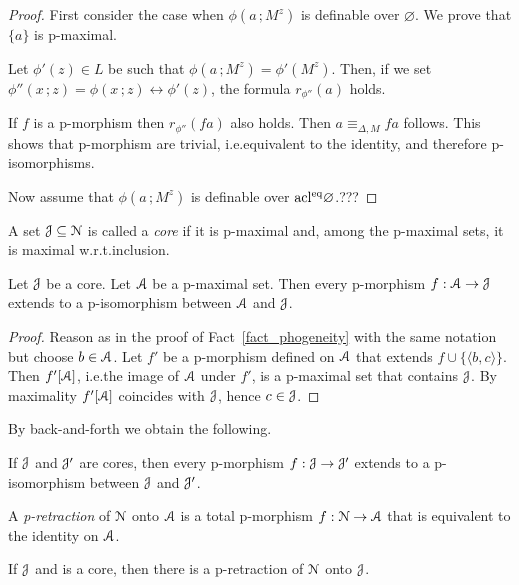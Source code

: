 \begin{proof}
  First consider the case when $\phi(a\,;M^z)$ is definable over $\varnothing$.
  We prove that $\{a\}$ is p-maximal.

  Let $\phi'(z)\in L$ be such that $\phi(a\,;M^z)=\phi'(M^z)$.
  Then, if we set $\phi''(x\,;z)=\phi(x\,;z)\leftrightarrow\phi'(z)$, the formula $r_{\phi''}(a)$ holds.

  If $f$ is a p-morphism then $r_{\phi''}(fa)$ also holds.
  Then $a\equiv_{\Delta,M}f\!a$ follows.
  This shows that p-morphism are trivial, i.e.\@ equivalent to the identity, and therefore p-isomorphisms.

  Now assume that $\phi(a\,;M^z)$ is definable over ${\rm acl^{eq}}\varnothing$.???
\end{proof}

A set $\EuScript J\subseteq\EuScript N$ is called a \emph{core} if it is p-maximal and, among the p-maximal sets, it is maximal w.r.t.\@ inclusion.

\begin{fact}\label{fact_onto}
  Let $\EuScript J$ be a core.
  Let $\EuScript A$ be a p-maximal set.
  Then every p-morphism $f:\EuScript A\to\EuScript J$ extends to a p-isomorphism between $\EuScript A$ and $\EuScript J$. 
\end{fact}

\begin{proof}
  Reason as in the proof of Fact~\ref{fact_phogeneity} with the same notation but choose $b\in\EuScript A$.
  Let $f'$ be a p-morphism defined on $\EuScript A$ that extends $f\cup\{\langle b,c\rangle\}$.
  Then $f'[\EuScript A]$, i.e.\@ the image of $\EuScript A$ under $f'$, is a p-maximal set that contains $\EuScript J$.
  By maximality $f'[\EuScript A]$ coincides with $\EuScript J$, hence $c\in\EuScript J$.
\end{proof}

By back-and-forth we obtain the following.

\begin{corollary}\label{fact_corephogeneity}
  If $\EuScript J$ and $\EuScript J'$ are cores, then every p-morphism $f:\EuScript J\to\EuScript J'$ extends to a p-isomorphism between $\EuScript J$ and $\EuScript J'$.
\end{corollary}

A \emph{p-retraction} of $\EuScript N$ onto $\EuScript A$ is a total p-morphism $f:\EuScript N\to\EuScript A$ that is equivalent to the identity on $\EuScript A$.

\begin{theorem}
  If $\EuScript J$ and is a core, then there is a p-retraction of $\EuScript N$ onto $\EuScript J$.
\end{theorem}


